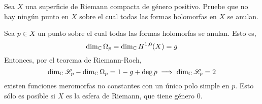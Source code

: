 \begin{exercise}
Sea $X$ una superficie de Riemann compacta de género positivo. Pruebe que no hay ningún punto en $X$ sobre el cual todas las formas holomorfas en $X$ se anulan.
\end{exercise}

\begin{solution}
Sea $p \in X$ un punto sobre el cual todas las formas holomorfas se anulan. Esto es,
$$\dim_\mathbb C \Omega_p = \dim_\mathbb C H^{1,0}(X) = g$$
Entonces, por el teorema de Riemann-Roch,
$$\dim_\mathbb C \mathscr L_p - \dim_\mathbb C \Omega_p = 1 - g + \deg p \implies \dim_\mathbb C \mathscr L_p = 2$$
existen funciones meromorfas no constantes con un único polo simple en $p$. Esto sólo es posible si $X$ es la esfera de Riemann, que tiene género $0$.
\end{solution}
